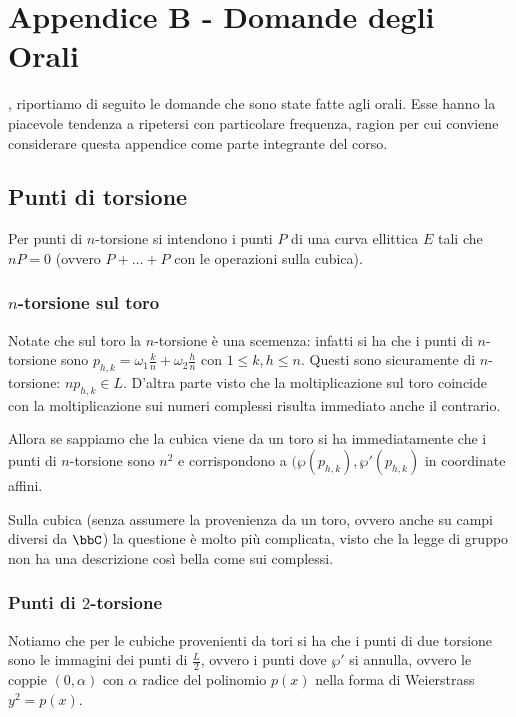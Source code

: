 \chapter{Appendice B - Domande degli Orali}
\justify

, riportiamo di seguito le domande che sono state fatte agli orali.
Esse hanno la piacevole tendenza a ripetersi con particolare frequenza, ragion per cui conviene considerare questa appendice come parte integrante del corso.

\section{Punti di torsione}
Per punti di $n$-torsione si intendono i punti $P$ di una curva ellittica $E$ tali che $nP = 0$ (ovvero $P + \ldots + P$ con le operazioni sulla cubica).

\subsection{$n$-torsione sul toro}
Notate che sul toro la $n$-torsione è una scemenza: infatti si ha che i punti di $n$-torsione sono $p_{h, k} = \omega_1 \frac{k}{n} + \omega_2 \frac{h}{n}$ con $1 \le k, h \le n$.
Questi sono sicuramente di $n$-torsione: $n p_{h, k} \in L$. D'altra parte visto che la moltiplicazione sul toro coincide con la moltiplicazione sui numeri complessi risulta immediato anche il contrario.

Allora se sappiamo che la cubica viene da un toro si ha immediatamente che i punti di $n$-torsione sono $n^2$ e corrispondono a $(\wp(p_{h, k}), \wp'(p_{h, k})$ in coordinate affini.

Sulla cubica (senza assumere la provenienza da un toro, ovvero anche su campi diversi da $\bbC$) la questione è molto più complicata, visto che la legge di gruppo non ha una descrizione così bella come sui complessi.

\subsection{Punti di $2$-torsione}
Notiamo che per le cubiche provenienti da tori si ha che i punti di due torsione sono le immagini dei punti di $\frac{L}{2}$, ovvero i punti dove $\wp'$ si annulla, ovvero le coppie $(0, \alpha)$ con $\alpha$ radice del polinomio $p(x)$ nella forma di Weierstrass $y^2 = p(x)$.

